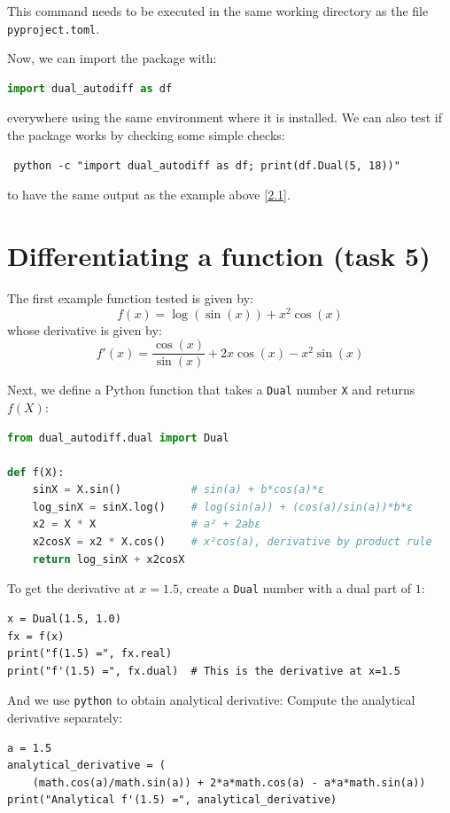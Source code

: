 \documentclass[12.5pt]{article}
\begin{document}
This command needs to be executed in the same working directory as the file \texttt{pyproject.toml}.

Now, we can import the package with:
\begin{lstlisting}[language=Python]
import dual_autodiff as df
\end{lstlisting} everywhere using the same environment where it is installed. We can also test if the package works by checking some simple checks: \begin{lstlisting}
 python -c "import dual_autodiff as df; print(df.Dual(5, 18))"
\end{lstlisting} to have the same output as the example above \ref{2.1}.


\newpage
\section{Differentiating a function (task 5)}

The first example function tested is given by:\[
f(x) = \log(\sin(x)) + x^2 \cos(x)
\]
whose derivative is given by:
\[
f'(x) = \frac{\cos(x)}{\sin(x)} + 2x \cos(x) - x^2 \sin(x)
\]

Next, we define a Python function that takes a \texttt{Dual} number \texttt{X} and returns \(f(X)\):

\begin{lstlisting}[language=Python]
from dual_autodiff.dual import Dual

def f(X):
    sinX = X.sin()           # sin(a) + b*cos(a)*ε
    log_sinX = sinX.log()    # log(sin(a)) + (cos(a)/sin(a))*b*ε
    x2 = X * X               # a² + 2abε
    x2cosX = x2 * X.cos()    # x²cos(a), derivative by product rule
    return log_sinX + x2cosX
\end{lstlisting}

To get the derivative at \(x = 1.5\), create a \texttt{Dual} number with a dual part of \(1\):

\begin{lstlisting}
x = Dual(1.5, 1.0)
fx = f(x)
print("f(1.5) =", fx.real)
print("f'(1.5) =", fx.dual)  # This is the derivative at x=1.5
\end{lstlisting}

And we use \texttt{python} to obtain analytical derivative:
Compute the analytical derivative separately:
\begin{lstlisting}
a = 1.5
analytical_derivative = (
    (math.cos(a)/math.sin(a)) + 2*a*math.cos(a) - a*a*math.sin(a))
print("Analytical f'(1.5) =", analytical_derivative)
\end{lstlisting}
\end{document}
